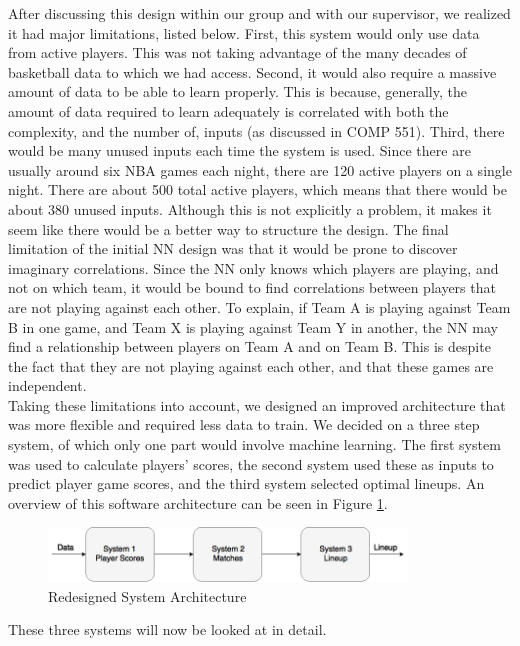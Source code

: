 After discussing this design within our group and with our supervisor, we realized it had major limitations, listed below. First, this system would only use data from active players. This was not taking advantage of the many decades of basketball data to which we had access. Second, it would also require a massive amount of data to be able to learn properly. This is because, generally, the amount of data required to learn adequately is correlated with both the complexity, and the number of, inputs (as discussed in COMP 551).
Third, there would be many unused inputs each time the system is used. Since there are usually around six NBA games each night, there are 120 active players on a single night. There are about 500 total active players, which means that there would be about 380 unused inputs. Although this is not explicitly a problem, it makes it seem like there would be a better way to structure the design. The final limitation of the initial NN design was that it would be prone to discover imaginary correlations. 
Since the NN only knows which players are playing, and not on which team, it would be bound to find correlations between players that are not playing against each other. To explain, if Team A is playing against Team B in one game, and Team X is playing against Team Y in another, the NN may find a relationship between players on Team A and on Team B. This is despite the fact that they are not playing against each other, and that these games are independent.\\
Taking these limitations into account, we designed an improved architecture that was more flexible and required less data to train. We decided on a three step system, of which only one part would involve machine learning. The first system was used to calculate players' scores, the second system used these as inputs to predict player game scores, and the third system selected optimal lineups. An overview of this software architecture can be seen in Figure \ref{fig:second_iteration}.
\begin{figure}[ht]
    \centering
    \includegraphics[width=0.85\textwidth]{figures/second_iteration}
    \caption{Redesigned System Architecture}
    \label{fig:second_iteration}
\end{figure}

These three systems will now be looked at in detail.

